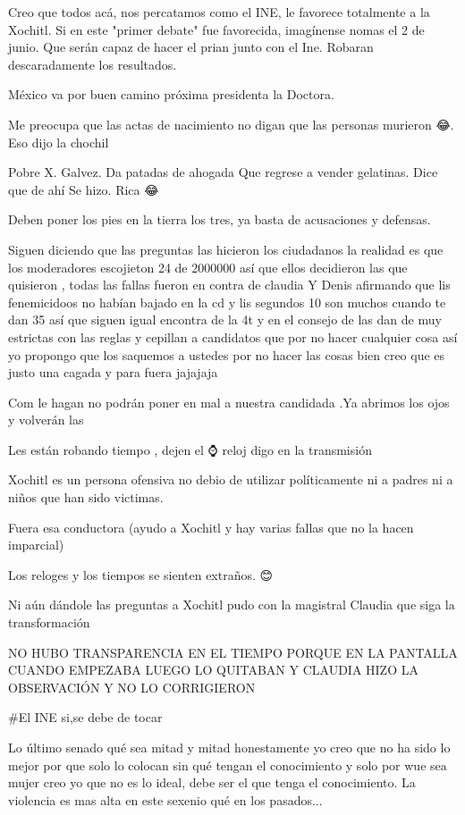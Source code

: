 Creo que todos acá,  nos percatamos como el INE, le favorece totalmente a la Xochitl.  Si en este "primer debate" fue favorecida,  imagínense nomas  el 2 de junio. Que serán  capaz  de hacer el prian junto con el Ine. Robaran descaradamente los resultados.

México va por buen camino próxima presidenta la Doctora.

Me preocupa que las actas de nacimiento no digan que las personas murieron 😂. Eso dijo la chochil

Pobre  X. Galvez. Da patadas de ahogada
Que regrese a vender gelatinas.  Dice que de ahí
Se hizo. Rica 😂

Deben poner los pies en la tierra los tres, ya basta de acusaciones y defensas.

Siguen diciendo que las preguntas las hicieron los ciudadanos la realidad es que los moderadores  escojieton 24 de 2000000 así que ellos decidieron las que quisieron , todas las fallas fueron en contra de claudia    Y Denis afirmando que lis fenemicidoos  no habían bajado en la cd  y lis segundos  10 son muchos cuando te dan 35 así que siguen igual encontra de la 4t y en el consejo de las dan de muy estrictas con las reglas y cepillan a candidatos que por no hacer cualquier cosa así yo propongo que los saquemos a ustedes por no hacer las cosas bien  creo que es justo una cagada y para fuera jajajaja

Com le hagan  no podrán poner en mal a nuestra candidada .Ya abrimos los ojos y volverán las 🐁🐀

Les están robando tiempo , dejen el ⌚ reloj digo en la transmisión

Xochitl es un persona ofensiva no debio de utilizar políticamente ni a padres ni a niños que han sido victimas.

Fuera esa conductora (ayudo a Xochitl y hay varias fallas que no la hacen imparcial) 

Los reloges y los tiempos se sienten extraños. 😊

Ni aún dándole las preguntas a Xochitl pudo con la magistral Claudia que siga la transformación

NO HUBO TRANSPARENCIA EN EL TIEMPO PORQUE EN LA PANTALLA CUANDO EMPEZABA LUEGO LO QUITABAN Y CLAUDIA HIZO LA OBSERVACIÓN Y NO LO CORRIGIERON

#El INE si,se debe de tocar

Lo último senado qué sea mitad y mitad honestamente yo creo que no ha sido lo mejor por que solo lo colocan sin qué tengan el conocimiento y solo por wue sea mujer creo yo que no es lo ideal, debe ser el que tenga el conocimiento. La violencia es mas alta en este sexenio qué en los pasados...

